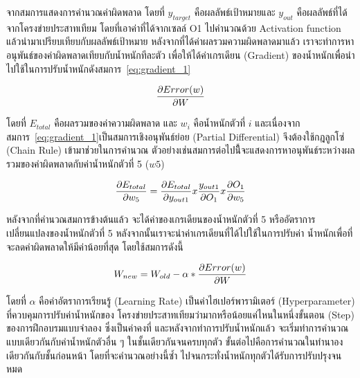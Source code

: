 \begin{itemize}
    จากสมการแสดงการคำนวณค่าผิดพลาด โดยที่ $y_{target}$ คือผลลัพธ์เป้าหมายและ $y_{out}$ คือผลลัพธ์ที่ได้จากโครงข่ายประสาทเทียม 
    โดยที่เอาค่าที่ได้จากเซลล์ O1 ไปคำนวณด้วย Activation function แล้วนำมาเปรียบเทียบกับผลลัพธ์เป้าหมาย หลังจากที่ได้ค่าผลรวมความผิดพลาดมาแล้ว 
    เราจะทำการหาอนุพันธ์ของค่าผิดพลาดเทียบกับน้ำหนักทีละตัว เพื่อให้ได้ค่าเกรเดียน (Gradient) ของน้ำหนักเพื่อนำไปใช้ในการปรับน้ำหนักดังสมการ~\ref{eq:gradient_1}

    \begin{equation}
        \centering
        \frac{\partial Error(w)}{\partial W}
        \label{eq:gradient_1}
    \end{equation}

    โดยที่ $E_{total}$ คือผลรวมของค่าความผิดพลาด และ $w_i$ คือน้ำหนักตัวที่ $i$
    และเนื่องจากสมการ~\ref{eq:gradient_1}เป็นสมการเชิงอนุพันธ์ย่อย (Partial Differential) จึงต้องใช้กฎลูกโซ่ (Chain Rule) 
    เข้ามาช่วยในการคำนวณ ตัวอย่างเช่นสมการต่อไปนี้ีจะแสดงการหาอนุพันธ์ระหว่างผลรวมของค่าผิดพลาดกับค่าน้ำหนักตัวที่ 5 ($w5$)

    \begin{equation}
        \centering
        \frac{\partial E_{total}}{\partial w_5} = \frac{\partial E_{total}}{\partial y_{out1}} x \frac{y_{out1}}{\partial O_1} x \frac{\partial O_1}{\partial w_5}
        \label{eq:Error_total_1}
    \end{equation}

    หลังจากที่คำนวณสมการข้างต้นแล้ว จะได้ค่าของเกรเดียนของน้ำหนักตัวที่ 5 หรืออัตราการเปลี่ยนแปลงของน้ำหนักตัวที่
    5 หลังจากนั้นเราจะนำค่าเกรเดียนที่ได้ไปใช้ในการปรับค่า
    น้ำหนักเพื่อที่จะลดค่าผิดพลาดให้มีค่าน้อยที่สุด โดยใช้สมการดังนี้

    \begin{equation}
        \centering
        W_{new} = W_{old} - \alpha *\frac{\partial Error(w)}{\partial W}
        \label{eq:new_weight_1}
    \end{equation}

    โดยที่ $\alpha$ คือค่าอัตราการเรียนรู้ (Learning Rate) เป็นค่าไฮเปอร์พารามิเตอร์ (Hyperparameter) ที่ควบคุมการปรับค่าน้ำหนักของ
    โครงข่ายประสาทเทียมว่ามากหรือน้อยแค่ไหนในหนึ่งขั้นตอน (Step) ของการฝึกอบรมแบบจำลอง ซึ่งเป็นค่าคงที่ 
    และหลังจากทำการปรับน้ำหนักแล้ว จะเริ่มทำการคำนวณแบบเดียวกันกับค่าน้ำหนักตัวอื่น ๆ ในชั้นเดียวกันจนครบทุกตัว ขั้นต่อไปคือการคำนวณในทำนาองเดียวกันกับชั้นก่อนหน้า
    โดยที่จะคำนวณอย่างนี้ซ้ำ ไปจนกระทั่งน้ำหนักทุกตัวได้รับการปรับปรุงจนหมด

\end{itemize}


